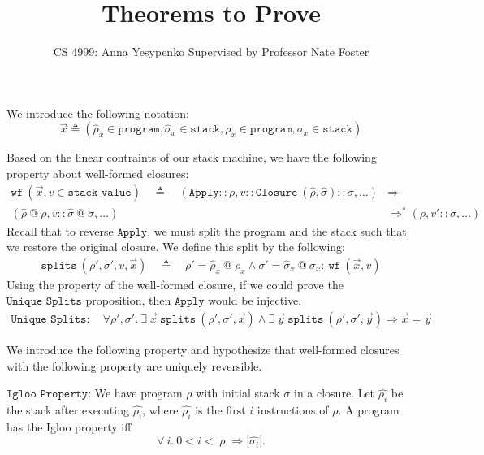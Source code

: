 \documentclass[11pt]{article}
\begin{document}
\title{Theorems to Prove}
\author{CS 4999: Anna Yesypenko Supervised by Professor Nate Foster}
\maketitle

We introduce the following notation: $$\vec{x} \triangleq (\hat{\rho}_x \in \texttt{program}, \hat{\sigma}_x \in \texttt{stack}, \rho_x \in \texttt{program}, \sigma_x \in \texttt{stack})$$

Based on the linear contraints of our stack machine, we have the following property about well-formed closures:
\begin{align*}
    \texttt{wf}\ (\vec{x}, v \in \texttt{stack\_value}) \quad \triangleq \quad (\texttt{Apply}::\rho, v::\texttt{Closure}\ (\hat{\rho}, \hat{\sigma})::\sigma, \dots) &\Longrightarrow\\
    (\hat{\rho}\ @\ \rho, v::\hat{\sigma}\ @\ \sigma, \dots) &\Longrightarrow^* (\rho, v'::\sigma, \dots)
\end{align*}
Recall that to reverse $\texttt{Apply}$, we must split the program and the stack such that we restore the original closure. We define this split by the following:
\begin{align*}
    \texttt{splits}\ (\rho', \sigma', v, \vec{x}) \quad \triangleq \quad \rho' = \hat{\rho}_x\ @\ \rho_x \wedge \sigma' = \hat{\sigma}_x\ @\ \sigma_x: \ \texttt{wf}\ (\vec{x}, v)
\end{align*}
Using the property of the well-formed closure, if we could prove the $\texttt{Unique Splits}$ proposition, then $\texttt{Apply}$ would be injective.
\begin{align*}
    \texttt{Unique Splits}: \quad \forall \rho', \sigma'.\ \exists\ \vec{x}\ \texttt{splits}\ (\rho', \sigma', \vec{x}) \wedge \exists\ \vec{y}\ \texttt{splits}\ (\rho', \sigma', \vec{y}) \Longrightarrow \vec{x} = \vec{y}
\end{align*}

We introduce the following property and hypothesize that well-formed closures with the following property are uniquely reversible.

$ \texttt{Igloo Property}$: We have program $\rho$ with initial stack $\sigma$ in a closure. Let $\hat{\rho_i}$ be the stack after executing $\hat{\rho_i}$, where $\hat{\rho_i}$ is the first $i$ instructions of $\rho$. A program has the Igloo property iff 
$$\forall\ i.\ 0 < i < |\rho| \Rightarrow |\hat{\sigma_i}|.$$
\end{document}
